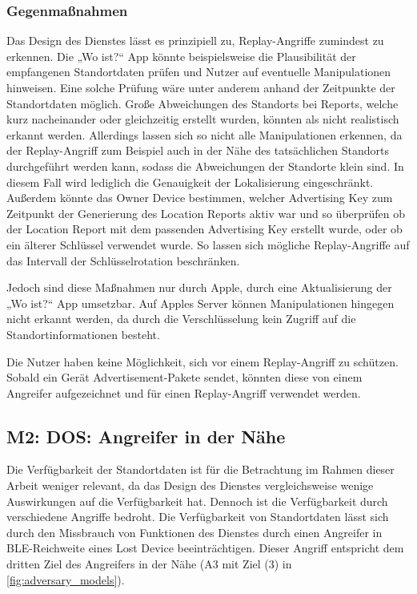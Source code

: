 \subsubsection{Gegenmaßnahmen}
Das Design des Dienstes lässt es prinzipiell zu, Replay-Angriffe zumindest zu erkennen.
Die „Wo ist?“ App könnte beispielsweise die Plausibilität der empfangenen Standortdaten prüfen und Nutzer auf eventuelle Manipulationen hinweisen.
Eine solche Prüfung wäre unter anderem anhand der Zeitpunkte der Standortdaten möglich.
Große Abweichungen des Standorts bei Reports, welche kurz nacheinander oder gleichzeitig erstellt wurden, könnten als nicht realistisch erkannt werden.
Allerdings lassen sich so nicht alle Manipulationen erkennen, da der Replay-Angriff zum Beispiel auch in der Nähe des tatsächlichen Standorts durchgeführt werden kann, sodass die Abweichungen der Standorte klein sind.
In diesem Fall wird lediglich die Genauigkeit der Lokalisierung eingeschränkt.
Außerdem könnte das Owner Device bestimmen, welcher Advertising Key zum Zeitpunkt der Generierung des Location Reports aktiv war und so überprüfen ob der Location Report mit dem passenden Advertising Key erstellt wurde, oder ob ein älterer Schlüssel verwendet wurde.
So lassen sich mögliche Replay-Angriffe auf das Intervall der Schlüsselrotation beschränken.

Jedoch sind diese Maßnahmen nur durch Apple, durch eine Aktualisierung der „Wo ist?“ App umsetzbar. 
Auf Apples Server können Manipulationen hingegen nicht erkannt werden, da durch die Verschlüsselung kein Zugriff auf die Standortinformationen besteht.

Die Nutzer haben keine Möglichkeit, sich vor einem Replay-Angriff zu schützen.
Sobald ein Gerät Advertisement-Pakete sendet, könnten diese von einem Angreifer aufgezeichnet und für einen Replay-Angriff verwendet werden.


\subsection[M2]{M2: \ac{DOS}: Angreifer in der Nähe}
\label{missbrauch:2}
Die Verfügbarkeit der Standortdaten ist für die Betrachtung im Rahmen dieser Arbeit weniger relevant, da das Design des Dienstes vergleichsweise wenige Auswirkungen auf die Verfügbarkeit hat.
Dennoch ist die Verfügbarkeit durch verschiedene Angriffe bedroht.
Die Verfügbarkeit von Standortdaten lässt sich durch den Missbrauch von Funktionen des Dienstes durch einen Angreifer in \ac{BLE}-Reichweite eines Lost Device beeinträchtigen.
Dieser Angriff entspricht dem dritten Ziel des Angreifers in der Nähe (A3 mit Ziel (3) in \autoref{fig:adversary_models}).

